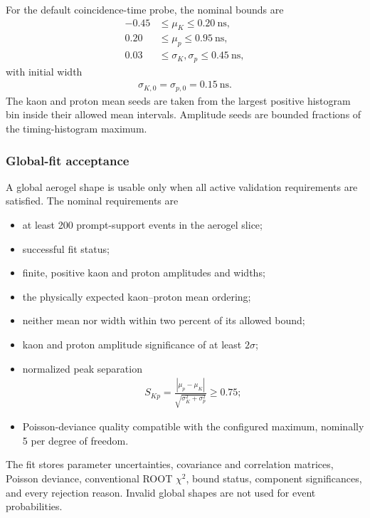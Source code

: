 \documentclass[11pt]{article}
\begin{document}
For the default coincidence-time probe, the nominal bounds are
\begin{align}
  -0.45 &\leq \mu_K \leq 0.20~\mathrm{ns},\\
   0.20 &\leq \mu_p \leq 0.95~\mathrm{ns},\\
   0.03 &\leq \sigma_K,\sigma_p \leq 0.45~\mathrm{ns},
\end{align}
with initial width
\begin{align}
  \sigma_{K,0}=\sigma_{p,0}=0.15~\mathrm{ns}.
\end{align}
The kaon and proton mean seeds are taken from the largest positive histogram bin
inside their allowed mean intervals.  Amplitude seeds are bounded fractions of
the timing-histogram maximum.

\subsubsection*{Global-fit acceptance}

A global aerogel shape is usable only when all active validation requirements
are satisfied.  The nominal requirements are
\begin{itemize}[leftmargin=2em]
  \item at least 200 prompt-support events in the aerogel slice;
  \item successful fit status;
  \item finite, positive kaon and proton amplitudes and widths;
  \item the physically expected kaon--proton mean ordering;
  \item neither mean nor width within two percent of its allowed bound;
  \item kaon and proton amplitude significance of at least $2\sigma$;
  \item normalized peak separation
  \begin{align}
    S_{Kp}
    =\frac{|\mu_p-\mu_K|}
           {\sqrt{\sigma_K^2+\sigma_p^2}}
    \geq0.75;
  \end{align}
  \item Poisson-deviance quality compatible with the configured maximum,
        nominally 5 per degree of freedom.
\end{itemize}

The fit stores parameter uncertainties, covariance and correlation matrices,
Poisson deviance, conventional ROOT $\chi^2$, bound status, component
significances, and every rejection reason.  Invalid global shapes are not used
for event probabilities.
\end{document}
